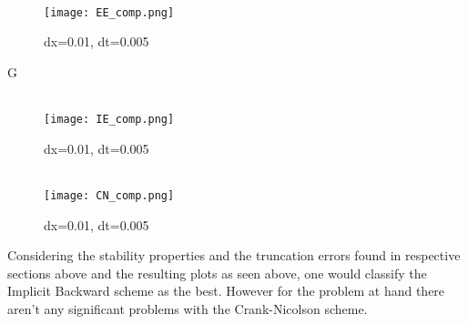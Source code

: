 \documentclass[a4paper,11pt]{article}
\begin{document}
    \begin{figure}[H]
        \centering
        \\
        \texttt{[image: EE\_comp.png]}
        \caption*{dx=0.01, dt=0.005}
    \end{figure}G
    \begin{figure}[H]
        \centering
        \\
        \texttt{[image: IE\_comp.png]}
        \caption*{dx=0.01, dt=0.005}
    \end{figure}
    \begin{figure}[H]
        \centering
        \\
        \texttt{[image: CN\_comp.png]}
        \caption*{dx=0.01, dt=0.005}
    \end{figure}
    Considering the stability properties and the truncation errors found in respective sections above and the resulting plots as seen above, one would classify the Implicit Backward scheme as the best. However for the problem at hand there aren't any significant problems with the Crank-Nicolson scheme.
\end{document}
